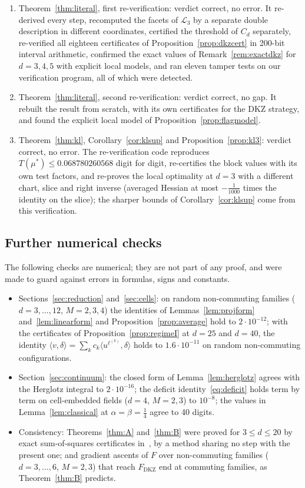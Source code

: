 \documentclass[11pt]{amsart}
\theoremstyle{definition}
\theoremstyle{remark}
\numberwithin{equation}{section}
\newcommand{\FD}{F_{\mathrm{DKZ}}}
\newcommand{\ip}[2]{\langle #1,#2\rangle}
\newcommand{\cL}{\mathcal{L}}
\begin{document}
\begin{enumerate}
\item Theorem~\ref{thm:literal}, first re-verification: verdict correct, no error. It re-derived every step,
recomputed the facets of $\cL_3$ by a separate double description in different coordinates, certified the
threshold of $C_d$ separately, re-verified all eighteen certificates of Proposition~\ref{prop:dkzcert} in 200-bit
interval arithmetic, confirmed the exact values of Remark~\ref{rem:exactdkz} for $d=3,4,5$ with explicit local models,
and ran eleven tamper tests on our verification program, all of which were detected.
\item Theorem~\ref{thm:literal}, second re-verification: verdict correct, no gap. It rebuilt the result from
scratch, with its own certificates for the DKZ strategy, and found the explicit local model of
Proposition~\ref{prop:flagmodel}.
\item Theorem~\ref{thm:kl}, Corollary~\ref{cor:klsup} and Proposition~\ref{prop:kl3}: verdict correct, no error. The
re-verification code reproduces $T(\mu^*)\le0.068780260568$ digit for digit, re-certifies the block values with its own
test factors, and re-proves the local optimality at $d=3$ with a different chart, slice and right inverse (averaged
Hessian at most $-\frac1{1000}$ times the identity on the slice); the sharper bounds of Corollary~\ref{cor:klsup} come
from this verification.
\end{enumerate}

\subsection{Further numerical checks}
The following checks are numerical; they are not part of any proof, and were made to guard against errors in formulas,
signs and constants.
\begin{itemize}
\item Sections~\ref{sec:reduction} and~\ref{sec:cells}: on random non-commuting families ($d=3,\dots,12$, $M=2,3,4$) the
identities of Lemmas~\ref{lem:projform} and~\ref{lem:linearform} and Proposition~\ref{prop:average} hold to $2\cdot10^{-12}$;
with the certificates of Proposition~\ref{prop:regimeI} at $d=25$ and $d=40$, the identity
$\ip v\delta=\sum_kc_k\ip{u^{\ell^{(k)}}}\delta$ holds to $1.6\cdot10^{-11}$ on random non-commuting configurations.
\item Section~\ref{sec:continuum}: the closed form of Lemma~\ref{lem:herglotz} agrees with the Herglotz integral to
$2\cdot10^{-16}$; the deficit identity~\eqref{eq:deficit} holds term by term on cell-embedded fields ($d=4$, $M=2,3$) to
$10^{-8}$; the values in Lemma~\ref{lem:classical} at $\alpha=\beta=\frac14$ agree to 40 digits.
\item Consistency: Theorems~\ref{thm:A} and~\ref{thm:B} were proved for $3\le d\le20$ by exact sum-of-squares certificates
in~\cite{repo-cglmp}, by a method sharing no step with the present one; and gradient ascents of $F$ over non-commuting
families ($d=3,\dots,6$, $M=2,3$) that reach $\FD$ end at commuting families, as Theorem~\ref{thm:B} predicts.
\end{itemize}
\end{document}
